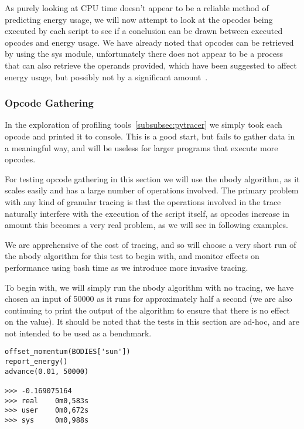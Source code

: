 As purely looking at CPU time doesn't appear to be a reliable method of predicting energy usage, we will now attempt to
look at the opcodes being executed by each script to see if a conclusion can be drawn between executed opcodes and
energy usage.
We have already noted that opcodes can be retrieved by using the sys module, unfortunately there does not appear to be
a process that can also retrieve the operands provided, which have been suggested to affect energy usage, but possibly
not by a significant amount~\cite{OperandPower}.

\subsubsection{Opcode Gathering}
In the exploration of profiling tools~\ref{subsubsec:pytracer} we simply took each opcode and printed it to console.
This is a good start, but fails to gather data in a meaningful way, and will be useless for larger programs that execute
more opcodes.

For testing opcode gathering in this section we will use the nbody algorithm, as it scales easily and has a large number
of operations involved.
The primary problem with any kind of granular tracing is that the operations involved in the trace naturally interfere
with the execution of the script itself, as opcodes increase in amount this becomes a very real problem, as we will see
in following examples.

We are apprehensive of the cost of tracing, and so will choose a very short run of the nbody algorithm for this test to
begin with, and monitor effects on performance using bash time as we introduce more invasive tracing.

To begin with, we will simply run the nbody algorithm with no tracing, we have chosen an input of 50000 as it runs for
approximately half a second (we are also continuing to print the output of the algorithm to ensure that there is no
effect on the value).
It should be noted that the tests in this section are ad-hoc, and are not intended to be used as a benchmark.

\begin{lstlisting}[caption={Running the nbody problem at an input of 50000},captionpos=b,label={lst:nbody-trace-none}]
offset_momentum(BODIES['sun'])
report_energy()
advance(0.01, 50000)

>>> -0.169075164
>>> real    0m0,583s
>>> user    0m0,672s
>>> sys     0m0,988s
\end{lstlisting}

